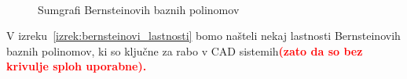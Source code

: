 \documentclass[isrm2, tisk]{fmfdelo}
\newcommand{\mycomment}[1]{\textbf{\textcolor{red}{#1}}}
\begin{document}
    \begin{figure}[h!]
        \captionsetup[subfigure]{labelformat=empty}
        \centering
        \qquad
         \\
        \qquad
        \caption{Sumgrafi Bernsteinovih baznih polinomov}
        \label{fig:bernstein-base}
    \end{figure}

    V izreku~\ref{izrek:bernsteinovi_lastnosti} bomo našteli nekaj lastnosti Bernsteinovih baznih polinomov, ki so ključne za rabo v CAD sistemih\mycomment{(zato da so bez krivulje sploh uporabne).}
\end{document}
